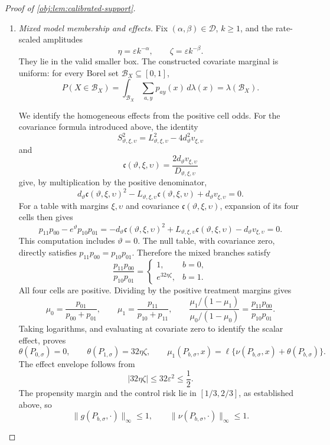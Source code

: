 \documentclass[11pt]{article}
\begin{document}
\begin{proof}[Proof of \cref{obj:lem:calibrated-support}]
\begin{enumerate}
\item \textit{Mixed model membership and effects.}
Fix \((\alpha,\beta)\in\mathcal D\), \(k\ge1\), and the rate-scaled amplitudes
\[
\eta=\varepsilon k^{-\alpha},\qquad
\zeta=\varepsilon k^{-\beta}.
\]
They lie in the valid smaller box. The constructed covariate marginal is uniform: for every Borel set \(\mathcal B_X\subseteq[0,1]\),
\[
P(X\in\mathcal B_X)
=\int_{\mathcal B_X}\sum_{a,y}p_{ay}(x)\,d\lambda(x)
=\lambda(\mathcal B_X).
\]

We identify the homogeneous effects from the positive cell odds. For the covariance formula introduced above, the identity
\[
S_{\vartheta,\xi,\upsilon}^2
=L_{\vartheta,\xi,\upsilon}^2
 -4d_\vartheta^2v_{\xi,\upsilon}
\]
and
\[
\mathfrak c(\vartheta,\xi,\upsilon)
=\frac{2d_\vartheta v_{\xi,\upsilon}}
       {D_{\vartheta,\xi,\upsilon}}
\]
give, by multiplication by the positive denominator,
\[
d_\vartheta\mathfrak c(\vartheta,\xi,\upsilon)^2
-L_{\vartheta,\xi,\upsilon}\mathfrak c(\vartheta,\xi,\upsilon)
+d_\vartheta v_{\xi,\upsilon}=0.
\]
For a table with margins \(\xi,\upsilon\) and covariance
\(\mathfrak c(\vartheta,\xi,\upsilon)\), expansion of its four cells then gives
\[
p_{11}p_{00}-e^\vartheta p_{10}p_{01}
=-d_\vartheta\mathfrak c(\vartheta,\xi,\upsilon)^2
 +L_{\vartheta,\xi,\upsilon}\mathfrak c(\vartheta,\xi,\upsilon)
 -d_\vartheta v_{\xi,\upsilon}=0.
\]
This computation includes \(\vartheta=0\). The null table, with covariance zero, directly satisfies
\(p_{11}p_{00}=p_{10}p_{01}\). Therefore the mixed branches satisfy
\[
\frac{p_{11}p_{00}}{p_{10}p_{01}}
=
\begin{cases}
1,&b=0,\\
e^{32\eta\zeta},&b=1.
\end{cases}
\]
All four cells are positive. Dividing by the positive treatment margins gives
\[
\mu_0=\frac{p_{01}}{p_{00}+p_{01}},
\qquad
\mu_1=\frac{p_{11}}{p_{10}+p_{11}},
\qquad
\frac{\mu_1/(1-\mu_1)}{\mu_0/(1-\mu_0)}
=\frac{p_{11}p_{00}}{p_{10}p_{01}}.
\]
Taking logarithms, and evaluating at covariate zero to identify the scalar effect, proves
\[
\theta(P_{0,\sigma})=0,\qquad
\theta(P_{1,\sigma})=32\eta\zeta,
\qquad
\mu_1(P_{b,\sigma},x)
=\ell\{\nu(P_{b,\sigma},x)+\theta(P_{b,\sigma})\}.
\]
The effect envelope follows from
\[
|32\eta\zeta|\le32\varepsilon^2\le\frac12.
\]
The propensity margin and the control risk lie in \([1/3,2/3]\), as established above, so
\[
\|g(P_{b,\sigma},\cdot)\|_\infty\le1,
\qquad
\|\nu(P_{b,\sigma},\cdot)\|_\infty\le1.
\]


\end{enumerate}
\end{proof}
\end{document}
